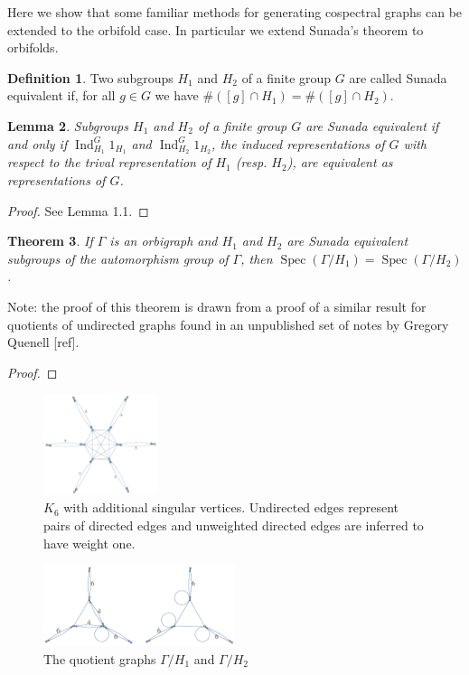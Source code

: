 \documentclass[12pt]{article}
\theoremstyle{plain}
\newtheorem{theorem}{Theorem}
\newtheorem{lemma}[theorem]{Lemma}
\theoremstyle{definition}
\newtheorem{definition}[theorem]{Definition}
\theoremstyle{remark}
\DeclareMathOperator*{\spec}{Spec}
\begin{document}
  Here we show that some familiar methods for generating cospectral graphs can be extended to the orbifold case. In particular we extend Sunada's theorem to orbifolds.

  \begin{definition}\label{def:SunadaEquivalentDefn}
    Two subgroups $H_1$ and $H_2$  of a finite group $G$ are called Sunada equivalent if, for all $g \in G$ we have $\#([g] \cap H_1) = \#([g] \cap H_2)$.
  \end{definition}

  \begin{lemma}\label{lemma:SunadaEquivRepresenation}
    Subgroups $H_1$ and $H_2$ of a finite group $G$ are Sunada equivalent if and only if $\operatorname{Ind}_{H_1}^G 1_{H_1}$ and $\operatorname{Ind}_{H_2}^G 1_{H_2}$, the induced representations of $G$ with respect to the trival representation of $H_1$ (resp. $H_2$), are equivalent as representations of $G$.
  \end{lemma}
  \begin{proof}
  See \cite{BrooksSunadaMethod} Lemma 1.1.
  \end{proof}

  \begin{theorem}\label{thm:Sunada}
    If $\Gamma$ is an orbigraph and $H_1$ and $H_2$ are Sunada equivalent subgroups of the automorphism group of $\Gamma$, then $\spec(\Gamma / H_1) = \spec(\Gamma / H_2)$.
  \end{theorem}

  Note: the proof of this theorem is drawn from a proof of a similar result for quotients of undirected graphs found in an unpublished set of notes by Gregory Quenell [ref]. %

  \begin{proof}
    
  \end{proof}

  \begin{figure}[h!]
    \caption{$K_6$ with additional singular vertices. Undirected edges represent pairs of directed edges and unweighted directed edges are inferred to have weight one.}\label{fig:K6WithGadgets}
    \centering
    \includegraphics[width=0.3\textwidth]{Graphics/K6WithGadgets}
  \end{figure}
  \begin{figure}[h!]
    \caption{The quotient graphs $\Gamma / H_1$ and $\Gamma / H_2$}\label{fig:SunadaQuotients}
    \centering
    \includegraphics[width=0.5\textwidth]{Graphics/SunadaQuotients}
  \end{figure}
\end{document}
